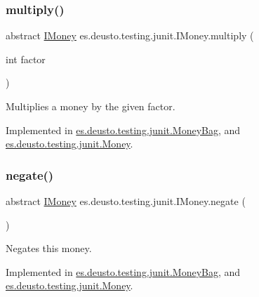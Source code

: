 \subsubsection{\texorpdfstring{multiply()}{multiply()}}
{\footnotesize\ttfamily abstract \hyperlink{interfacees_1_1deusto_1_1testing_1_1junit_1_1_i_money}{I\+Money} es.\+deusto.\+testing.\+junit.\+I\+Money.\+multiply (\begin{DoxyParamCaption}\item[{int}]{factor }\end{DoxyParamCaption})\hspace{0.3cm}{\ttfamily [abstract]}}

Multiplies a money by the given factor. 

Implemented in \hyperlink{classes_1_1deusto_1_1testing_1_1junit_1_1_money_bag_aa20ce4cc70c2ba0bc9a5ccb96635d506}{es.\+deusto.\+testing.\+junit.\+Money\+Bag}, and \hyperlink{classes_1_1deusto_1_1testing_1_1junit_1_1_money_a02c7d4e9013710f70d1d46e9c9ebae88}{es.\+deusto.\+testing.\+junit.\+Money}.

\mbox{\label{interfacees_1_1deusto_1_1testing_1_1junit_1_1_i_money_a741967d7aa89055b6873619303b11385}} 
\subsubsection{\texorpdfstring{negate()}{negate()}}
{\footnotesize\ttfamily abstract \hyperlink{interfacees_1_1deusto_1_1testing_1_1junit_1_1_i_money}{I\+Money} es.\+deusto.\+testing.\+junit.\+I\+Money.\+negate (\begin{DoxyParamCaption}{ }\end{DoxyParamCaption})\hspace{0.3cm}{\ttfamily [abstract]}}

Negates this money. 

Implemented in \hyperlink{classes_1_1deusto_1_1testing_1_1junit_1_1_money_bag_abf06bf97e548f95038756608fe0c8351}{es.\+deusto.\+testing.\+junit.\+Money\+Bag}, and \hyperlink{classes_1_1deusto_1_1testing_1_1junit_1_1_money_ae5f0bc3ea87f1fd55d6478653b8f2e36}{es.\+deusto.\+testing.\+junit.\+Money}.

